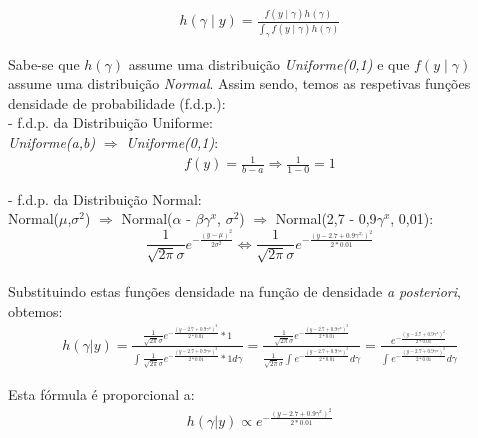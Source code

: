 \documentclass{article}
\begin{document}
					\begin{align*}
						h(\gamma\mid\textit{y}) = \frac { f(\textit{y}\mid\gamma)  h(\gamma) } { \int_{\gamma}^{}  f(\textit{y}\mid\gamma)  h(\gamma) } 
					\end{align*}

					Sabe-se que $h(\gamma)$ assume uma distribuição \textit{Uniforme(0,1)} e que $f(\textit{y}\mid\gamma)$ assume uma distribuição \textit{Normal}. Assim sendo, temos as respetivas funções densidade de probabilidade (f.d.p.): \\

					- f.d.p. da Distribuição Uniforme:\\
					\textit{Uniforme(a,b)} $\Rightarrow$ \textit{Uniforme(0,1)}: \\
					\begin{align*}
						f(\textit{y}) = \frac{1}{b-a}\Rightarrow \frac{1}{1-0} = 1 
					\end{align*} 

					- f.d.p. da Distribuição Normal:\\
					Normal($\mu$,$\sigma^2$) $\Rightarrow$ Normal($\alpha$ - $\beta\gamma^x$, $\sigma^2$) $\Rightarrow$ Normal(2,7 - 0,9$\gamma^x$, 0,01):\\
					
					\begin{equation*}
						\frac{1}{\sqrt{2\pi}\sigma}e^{-\frac{(y-\mu)^2}{2\sigma^2}} \Leftrightarrow \frac{1}{\sqrt{2\pi}\sigma}e^{-\frac{(y-2.7+0.9\gamma^{x_{i}})^2}{2*0.01}}
					\end{equation*}
			\paragraph{}
					
	Substituindo estas funções densidade na função de densidade \textit{a posteriori}, obtemos:
					\begin{align*}
						h(\gamma|y) = \frac{\frac{1}{\sqrt{2\pi}\sigma}e^{-\frac{(y-2.7+0.9\gamma^{x})^2}{2*0.01}}*1}{\int_{}^{}{\frac{1}{\sqrt{2\pi}\sigma}e^{-\frac{(y-2.7+0.9\gamma^x)^2}{2*0.01}}} *1 d\gamma} 
								= \frac{\frac{1}{\sqrt{2\pi}\sigma}e^{-\frac{(y-2.7+0.9\gamma^{x})^2}{2*0.01}}}{\frac{1}{\sqrt{2\pi}\sigma}\int_{}^{}{e^{-\frac{(y-2.7+0.9\gamma^x)^2}{2*0.01}}}  d\gamma} 
								= \frac{e^{-\frac{(y-2.7+0.9\gamma^{x})^2}{2*0.01}}}{\int_{}^{}{e^{-\frac{(y-2.7+0.9\gamma^x)^2}{2*0.01}}}  d\gamma}
					\end{align*}

	Esta fórmula é proporcional a:
					\begin{align*}
						h(\gamma | y ) \propto e^{-\frac{(y-2.7+0.9\gamma^x)^2}{2*0.01}}
					\end{align*}
					
\end{document}
